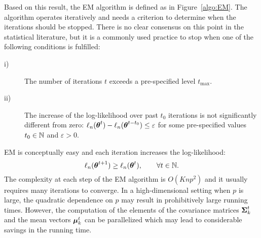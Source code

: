 Based on this result, the EM algorithm is defined as in Figure~\ref{algo:EM}.
The algorithm operates iteratively and needs a criterion to determine when
the iterations should be stopped. There is no clear consensus on this point in the
statistical literature, but it is a commonly used  practice to stop when one of the
following conditions is fulfilled:
\begin{description}
\item[i)]  The number of iterations $t$ exceeds a pre-specified level $t_{\max}$.
\item[ii)] The increase of the log-likelihood over past $t_0$ iterations is not
significantly different from zero: $\ell_n({\boldsymbol\theta}^{t})-\ell_n({\boldsymbol\theta}^{t-t_0})\le \varepsilon$
for some pre-specified values $t_0\in{\mathbb N}$ and $\varepsilon>0$.
\end{description}
EM is conceptually easy and each iteration increases the log-likelihood:
$$
\ell_n({\boldsymbol\theta}^{t+1})\ge \ell_n({\boldsymbol\theta}^{t}),\qquad \forall t\in{\mathbb N}.
$$
The complexity at each step of the EM algorithm is $O(Knp^2)$ and
it usually requires many iterations to converge. In a high-dimensional setting
when $p$ is large, the quadratic dependence on $p$ may result in prohibitively
large running times. However, the computation of the elements of the covariance
matrices $\boldsymbol\Sigma^t_k$ and the mean vectors $\boldsymbol\mu^t_k$ can be parallelized which
may lead to considerable savings in the running time.
